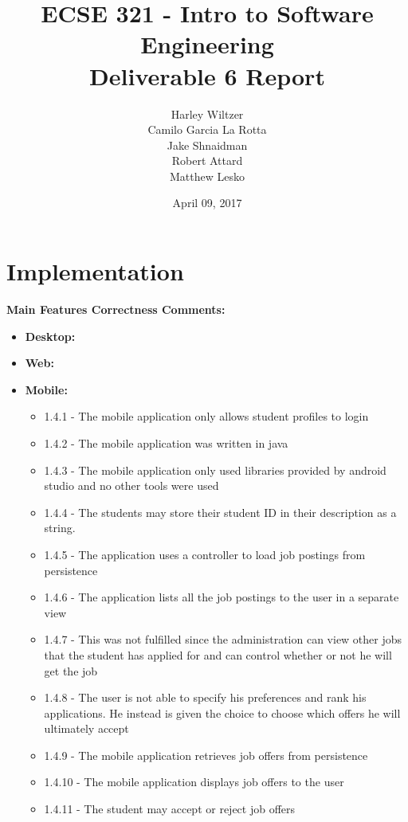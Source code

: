 \documentclass[12pt]{article}
\title{ECSE 321 - Intro to Software Engineering\\Deliverable 6 Report}
\author{Harley Wiltzer\\Camilo Garcia La Rotta\\Jake Shnaidman\\Robert Attard\\Matthew Lesko}
\date{April 09, 2017}
\begin{document}
\maketitle
\newpage
{} %
\tableofcontents
\newpage
\section{Implementation}
\textbf{Main Features Correctness Comments:}
\begin{itemize}
	\item \textbf{Desktop:}
	\item \textbf{Web:}
	\item \textbf{Mobile:}\
	\begin{itemize}
	    \item 1.4.1 - The mobile application only allows student profiles to login
	    \item 1.4.2 - The mobile application was written in java
	    \item 1.4.3 - The mobile application only used libraries provided by android studio and no other tools were used
	    \item 1.4.4 - The students may store their student ID in their description as a string.
	    \item 1.4.5 - The application uses a controller to load job postings from persistence
	    \item 1.4.6 - The application lists all the job postings to the user in a separate view
	    \item 1.4.7 - This was not fulfilled since the administration can view other jobs that the student has applied for and can control whether or not he will get the job
	    \item 1.4.8 - The user is not able to specify his preferences and rank his applications. He instead is given the choice to choose which offers he will ultimately accept
	    \item 1.4.9 - The mobile application retrieves job offers from persistence
	    \item 1.4.10 - The mobile application displays job offers to the user
	    \item 1.4.11 - The student may accept or reject job offers
	\end{itemize}
\end{itemize}
\end{document}
